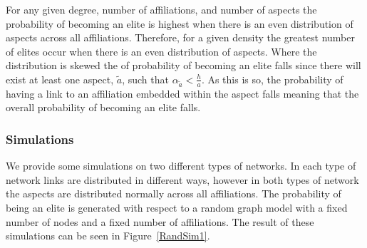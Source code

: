 \begin{subappendices}
For any given degree, number of affiliations, and number of aspects the probability of becoming an elite is highest when there is an even distribution of aspects across all affiliations. Therefore, for a given density the greatest number of elites occur when there is an even distribution of aspects. Where the distribution is skewed the of probability of becoming an elite falls since there will exist at least one aspect, $\tilde{a}$, such that $\alpha_{\tilde{a}} < \frac{h}{a}$. As this is so, the probability of having a link to an affiliation embedded within the aspect falls meaning that the overall probability of becoming an elite falls.

\subsubsection*{Simulations}

We provide some simulations on two different types of networks. In each type of network links are distributed in different ways, however in both types of network the aspects are distributed normally across all affiliations. The probability of being an elite is generated with respect to a random graph model with a fixed number of nodes and a fixed number of affiliations. The result of these simulations can be seen in Figure~\ref{RandSim1}.


\end{subappendices}
